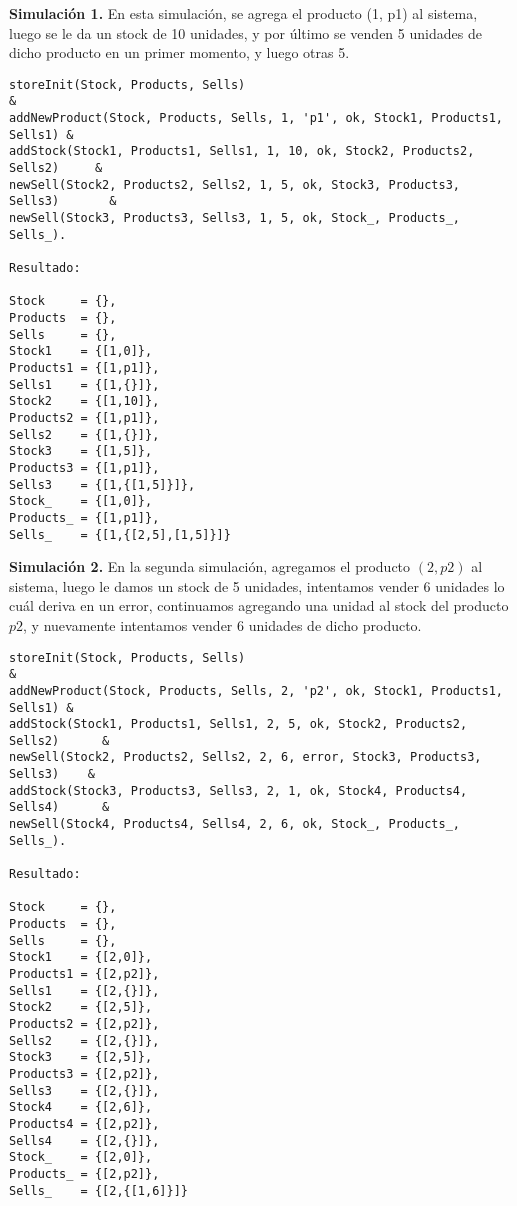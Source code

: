 \documentclass[fleqn,colorlinks,linkcolor=blue,citecolor=blue,urlcolor=blue]{article}
\begin{document}
\noindent
\textbf{Simulación 1.} En esta simulación, se agrega el producto (1, p1) al sistema, luego se le da un stock de 10 unidades, y por último se venden 5 unidades de dicho producto en un primer momento, y luego otras 5.

\begin{verbatim}
storeInit(Stock, Products, Sells)                                             & 
addNewProduct(Stock, Products, Sells, 1, 'p1', ok, Stock1, Products1, Sells1) &
addStock(Stock1, Products1, Sells1, 1, 10, ok, Stock2, Products2, Sells2)     &
newSell(Stock2, Products2, Sells2, 1, 5, ok, Stock3, Products3, Sells3)       &
newSell(Stock3, Products3, Sells3, 1, 5, ok, Stock_, Products_, Sells_).

Resultado:

Stock     = {},
Products  = {},
Sells     = {},
Stock1    = {[1,0]},
Products1 = {[1,p1]},
Sells1    = {[1,{}]},
Stock2    = {[1,10]},
Products2 = {[1,p1]},
Sells2    = {[1,{}]},
Stock3    = {[1,5]},
Products3 = {[1,p1]},
Sells3    = {[1,{[1,5]}]},
Stock_    = {[1,0]},
Products_ = {[1,p1]},
Sells_    = {[1,{[2,5],[1,5]}]}
\end{verbatim}

\noindent
\textbf{Simulación 2.} En la segunda simulación, agregamos el producto $(2, p2)$ al sistema, luego le damos un stock de 5 unidades, intentamos vender 6 unidades lo cuál deriva en un error, continuamos agregando una unidad al stock del producto $p2$, y nuevamente intentamos vender 6 unidades de dicho producto.

\begin{verbatim}
storeInit(Stock, Products, Sells)                                             & 
addNewProduct(Stock, Products, Sells, 2, 'p2', ok, Stock1, Products1, Sells1) & 
addStock(Stock1, Products1, Sells1, 2, 5, ok, Stock2, Products2, Sells2)      &
newSell(Stock2, Products2, Sells2, 2, 6, error, Stock3, Products3, Sells3)    & 
addStock(Stock3, Products3, Sells3, 2, 1, ok, Stock4, Products4, Sells4)      & 
newSell(Stock4, Products4, Sells4, 2, 6, ok, Stock_, Products_, Sells_).

Resultado:

Stock     = {},
Products  = {},
Sells     = {},
Stock1    = {[2,0]},
Products1 = {[2,p2]},
Sells1    = {[2,{}]},
Stock2    = {[2,5]},
Products2 = {[2,p2]},
Sells2    = {[2,{}]},
Stock3    = {[2,5]},
Products3 = {[2,p2]},
Sells3    = {[2,{}]},
Stock4    = {[2,6]},
Products4 = {[2,p2]},
Sells4    = {[2,{}]},
Stock_    = {[2,0]},
Products_ = {[2,p2]},
Sells_    = {[2,{[1,6]}]}
\end{verbatim}
\end{document}

